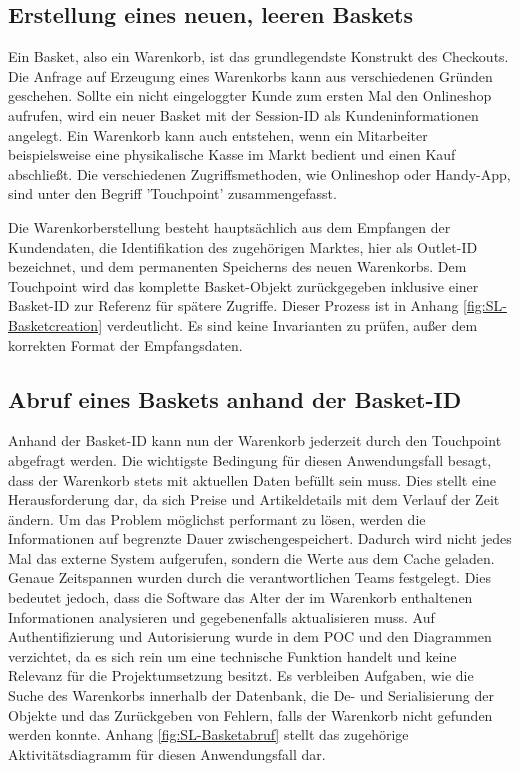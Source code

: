 \subsection{Erstellung eines neuen, leeren Baskets}

Ein Basket, also ein Warenkorb, ist das grundlegendste Konstrukt des Checkouts. Die Anfrage auf Erzeugung eines Warenkorbs kann aus verschiedenen Gründen geschehen. Sollte ein nicht eingeloggter Kunde zum ersten Mal den Onlineshop aufrufen, wird ein neuer Basket mit der Session-ID als Kundeninformationen angelegt. Ein Warenkorb kann auch entstehen, wenn ein Mitarbeiter beispielsweise eine physikalische Kasse im Markt bedient und einen Kauf abschließt. Die verschiedenen Zugriffsmethoden, wie Onlineshop oder Handy-App, sind unter den Begriff 'Touchpoint' zusammengefasst.

Die Warenkorberstellung besteht hauptsächlich aus dem Empfangen der Kundendaten, die Identifikation des zugehörigen Marktes, hier als Outlet-ID bezeichnet, und dem permanenten Speicherns des neuen Warenkorbs. Dem Touchpoint wird das komplette Basket-Objekt zurückgegeben inklusive einer Basket-ID zur Referenz für spätere Zugriffe. Dieser Prozess ist in Anhang \ref{fig:SL-Basketcreation} verdeutlicht. Es sind keine Invarianten zu prüfen, außer dem korrekten Format der Empfangsdaten.


\subsection{Abruf eines Baskets anhand der Basket-ID}

Anhand der Basket-ID kann nun der Warenkorb jederzeit durch den Touchpoint abgefragt werden. Die wichtigste Bedingung für diesen Anwendungsfall besagt, dass der Warenkorb stets mit aktuellen Daten befüllt sein muss. Dies stellt eine Herausforderung dar, da sich Preise und Artikeldetails mit dem Verlauf der Zeit ändern. Um das Problem möglichst performant zu lösen, werden die Informationen auf begrenzte Dauer zwischengespeichert. Dadurch wird nicht jedes Mal das externe System aufgerufen, sondern die Werte aus dem Cache geladen. Genaue Zeitspannen wurden durch die verantwortlichen Teams festgelegt. Dies bedeutet jedoch, dass die Software das Alter der im Warenkorb enthaltenen Informationen analysieren und gegebenenfalls aktualisieren muss. Auf Authentifizierung und Autorisierung wurde in dem POC und den Diagrammen verzichtet, da es sich rein um eine technische Funktion handelt und keine Relevanz für die Projektumsetzung besitzt. Es verbleiben Aufgaben, wie die Suche des Warenkorbs innerhalb der Datenbank, die De- und Serialisierung der Objekte und das Zurückgeben von Fehlern, falls der Warenkorb nicht gefunden werden konnte. Anhang \ref{fig:SL-Basketabruf} stellt das zugehörige Aktivitätsdiagramm für diesen Anwendungsfall dar.

